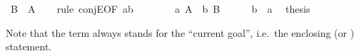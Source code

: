 \begin{isabellebody}
\ {\isachardoublequoteopen}B\ {\isasymand}\ A{\isachardoublequoteclose}\isanewline
\ \ \isamarkupfalse%
\ {\isacharparenleft}rule\ conjE{\isacharbrackleft}OF\ ab{\isacharbrackright}{\isacharparenright}\ \ %
\isanewline
\ \ \ \ \isamarkupfalse%
\ a{\isacharcolon}\ {\isachardoublequoteopen}A{\isachardoublequoteclose}\ \ b{\isacharcolon}\ {\isachardoublequoteopen}B{\isachardoublequoteclose}\isanewline
\ \ \ \ \isamarkupfalse%
\ b\ \ a\ \isamarkupfalse%
\ {\isacharquery}thesis\ \isacommand{{\isachardot}{\isachardot}}\isamarkupfalse%
\isanewline
\ \ \isamarkupfalse%
\isanewline
{}\isamarkupfalse%
%
\endisatagproof
{\isafoldproof}%
%
\isadelimproof
%
\endisadelimproof
%
\begin{isamarkuptext}%
\noindent Note that the term  always stands for the
``current goal'', i.e.\ the enclosing  (or
) statement.


\end{isamarkuptext}
\end{isabellebody}
